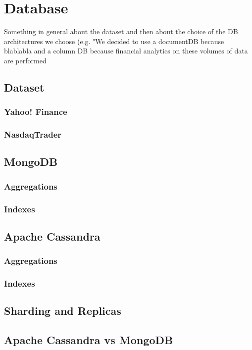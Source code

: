 \chapter{Database}

Something in general about the dataset and then about the choice of the DB architectures we choose (e.g. "We decided to use a documentDB because blablabla and a column DB because financial analytics on these volumes of data are performed 

\section{Dataset}

\subsection{Yahoo! Finance}

\subsection{NasdaqTrader}

\section{MongoDB}
\subsection{Aggregations}
\subsection{Indexes}

\section{Apache Cassandra}
\subsection{Aggregations}
\subsection{Indexes}

\section{Sharding and Replicas}

\section{Apache Cassandra vs MongoDB}
